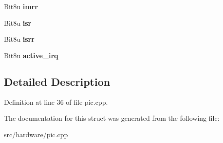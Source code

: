 \begin{DoxyCompactItemize}
\item 
\hypertarget{structPIC__Controller_a138308d81e33e95b85c37931a67427d0}{Bit8u {\bfseries imrr}}\label{structPIC__Controller_a138308d81e33e95b85c37931a67427d0}

\item 
\hypertarget{structPIC__Controller_a659d63dbd7cba92eed18a49421d94bec}{Bit8u {\bfseries isr}}\label{structPIC__Controller_a659d63dbd7cba92eed18a49421d94bec}

\item 
\hypertarget{structPIC__Controller_ae3d8234bf6bc4cb37b27e961fee92f72}{Bit8u {\bfseries isrr}}\label{structPIC__Controller_ae3d8234bf6bc4cb37b27e961fee92f72}

\item 
\hypertarget{structPIC__Controller_abbe151d9c4816820e6e8e2fb3f5c2b8f}{Bit8u {\bfseries active\-\_\-irq}}\label{structPIC__Controller_abbe151d9c4816820e6e8e2fb3f5c2b8f}

\end{DoxyCompactItemize}


\subsection{Detailed Description}


Definition at line 36 of file pic.\-cpp.



The documentation for this struct was generated from the following file\-:\begin{DoxyCompactItemize}
\item 
src/hardware/pic.\-cpp\end{DoxyCompactItemize}
